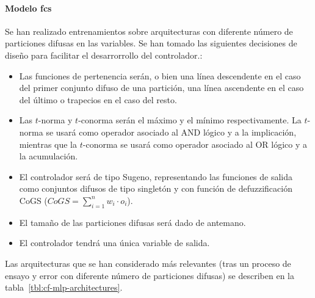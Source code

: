 \paragraph{Modelo \ac{fcs}}

Se han realizado entrenamientos sobre arquitecturas con diferente número de particiones difusas en las variables. Se han tomado las siguientes decisiones de diseño para facilitar el desarrorrollo del controlador.:

\begin{itemize}
	\item Las funciones de pertenencia serán, o bien una línea descendente en el caso del primer conjunto difuso de una partición, una línea ascendente en el caso del último o trapecios en el caso del resto.
	\item Las $t$-norma y $t$-conorma serán el máximo y el mínimo respectivamente. La $t$-norma se usará como operador asociado al AND lógico y a la implicación, mientras que la $t$-conorma se usará como operador asociado al OR lógico y a la acumulación.
	\item El controlador será de tipo Sugeno, representando las funciones de salida como conjuntos difusos de tipo singletón y con función de defuzzificación CoGS ($CoGS = \sum_{i=1}^n w_i \cdot o_i$).
	\item El tamaño de las particiones difusas será dado de antemano.
	\item El controlador tendrá una única variable de salida.
\end{itemize}

Las arquitecturas que se han considerado más relevantes (tras un proceso de ensayo y error con diferente número de particiones difusas) se describen en la tabla~\ref{tbl:cf-mlp-architectures}. 

